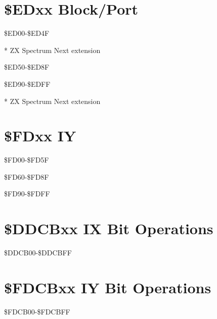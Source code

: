 \section{\$EDxx Block/Port}
\begin{table}[h]\centering\scriptsize
  \caption{\$ED00-\$ED4F}

  * ZX Spectrum Next extension
\end{table}
\begin{table}[h]\centering\scriptsize
  \caption{\$ED50-\$ED8F}
\end{table}
\begin{table}[h]\centering\scriptsize
  \caption{\$ED90-\$EDFF}

  * ZX Spectrum Next extension
\end{table}
\section{\$FDxx IY}
\begin{table}[h]\centering\scriptsize
  \caption{\$FD00-\$FD5F}
\end{table}
\begin{table}[h]\centering\scriptsize
  \caption{\$FD60-\$FD8F}
\end{table}
\begin{table}[h]\centering\scriptsize
  \caption{\$FD90-\$FDFF}
\end{table}
\section{\$DDCBxx IX Bit Operations}
\begin{table}[h]\centering\scriptsize
  \caption{\$DDCB00-\$DDCBFF}
\end{table}
\section{\$FDCBxx IY Bit Operations}
\begin{table}[h]\centering\scriptsize
  \caption{\$FDCB00-\$FDCBFF}
\end{table}
